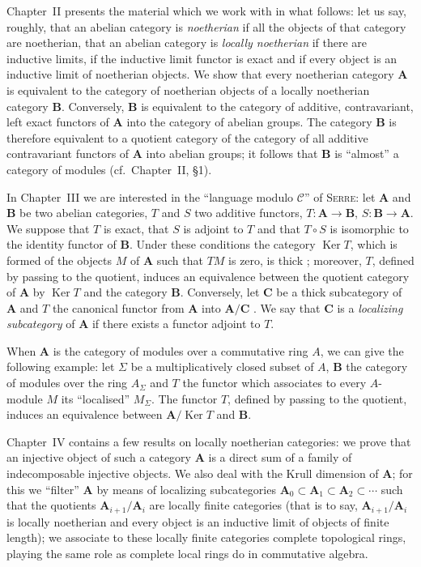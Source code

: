 Chapter~II presents the material which we work with in what follows: let us
say, roughly, that an abelian category is \emph{noetherian} if all the objects
of that category are noetherian, that an abelian category is \emph{locally
noetherian} if there are inductive limits, if the inductive limit functor is
exact and if every object is an inductive limit of noetherian objects. We
show that every noetherian category $\mathbf{A}$ is equivalent to the category
of noetherian objects of a locally noetherian category $\mathbf{B}$.
Conversely, $\mathbf{B}$ is equivalent to the category of additive,
contravariant, left exact functors of $\mathbf{A}$ into the category of abelian
groups. The category $\mathbf{B}$ is therefore equivalent to a quotient
category of the category of all additive contravariant functors of
$\mathbf{A}$ into abelian groups; it follows that $\mathbf{B}$ is
``almost'' a category of modules (cf.\ Chapter~II, \S1).

In Chapter~III we are interested in the ``language modulo $\mathcal{C}$'' of
\textsc{Serre}: let $\mathbf{A}$ and $\mathbf{B}$ be two abelian categories,
$T$ and $S$ two additive functors, $T:\mathbf{A}\to\mathbf{B}$,
$S:\mathbf{B}\to\mathbf{A}$. We suppose that $T$ is exact, that $S$ is
adjoint to $T$ and that $T\circ S$ is isomorphic to the identity functor of
$\mathbf{B}$. Under these conditions the category $\operatorname{Ker} T$,
which is formed of the objects $M$ of $\mathbf{A}$ such that $TM$ is zero, is
thick \cite{grothendieck-1}; moreover, $T$, defined by passing to the quotient, induces an
equivalence between the quotient category of $\mathbf{A}$ by
$\operatorname{Ker} T$ \cite{grothendieck-1} and the category $\mathbf{B}$. Conversely, let
$\mathbf{C}$ be a thick subcategory of $\mathbf{A}$ and $T$ the canonical
functor from $\mathbf{A}$ into $\mathbf{A}/\mathbf{C}$ \cite{grothendieck-1}. We say that
$\mathbf{C}$ is a \emph{localizing subcategory} of $\mathbf{A}$ if there
exists a functor adjoint to $T$.

When $\mathbf{A}$ is the category of modules over a commutative ring $A$, we
can give the following example: let $\Sigma$ be a multiplicatively closed subset
of $A$, $\mathbf{B}$ the category of modules over the ring $A_\Sigma$ and $T$
the functor which associates to every $A$-module $M$ its ``localised''
$M_\Sigma$. The functor $T$, defined by passing to the quotient, induces an
equivalence between $\mathbf{A}/\operatorname{Ker} T$ and $\mathbf{B}$.

Chapter~IV contains a few results on locally noetherian categories: we prove
that an injective object of such a category $\mathbf{A}$ is a direct sum of a
family of indecomposable injective objects. We also deal with the Krull
dimension of $\mathbf{A}$; for this we ``filter'' $\mathbf{A}$ by means of
localizing subcategories $\mathbf{A}_0\subset\mathbf{A}_1\subset\mathbf{A}_2\subset\cdots$
such that the quotients $\mathbf{A}_{i+1}/\mathbf{A}_i$ are locally finite
categories (that is to say, $\mathbf{A}_{i+1}/\mathbf{A}_i$ is locally
noetherian and every object is an inductive limit of objects of finite
length); we associate to these locally finite categories complete topological
rings, playing the same role as complete local rings do in commutative
algebra.

